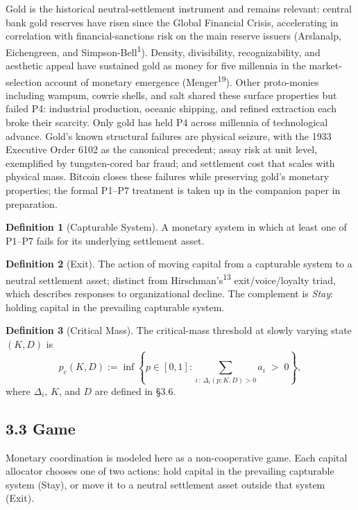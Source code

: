 \documentclass[12pt]{article}
\theoremstyle{definition}
\newtheorem{definition}{Definition}
\theoremstyle{remark}
\begin{document}
Gold is the historical neutral-settlement instrument and remains relevant: central bank gold reserves have risen since the Global Financial Crisis, accelerating in correlation with financial-sanctions risk on the main reserve issuers (Arslanalp, Eichengreen, and Simpson-Bell\textsuperscript{1}). Density, divisibility, recognizability, and aesthetic appeal have sustained gold as money for five millennia in the market-selection account of monetary emergence (Menger\textsuperscript{19}). Other proto-monies including wampum, cowrie shells, and salt shared these surface properties but failed P4: industrial production, oceanic shipping, and refined extraction each broke their scarcity. Only gold has held P4 across millennia of technological advance. Gold's known structural failures are physical seizure, with the 1933 Executive Order 6102 as the canonical precedent; assay risk at unit level, exemplified by tungsten-cored bar fraud; and settlement cost that scales with physical mass. Bitcoin closes these failures while preserving gold's monetary properties; the formal P1--P7 treatment is taken up in the companion paper in preparation.


\begin{definition}[Capturable System]
A monetary system in which at least one of P1--P7 fails for its
underlying settlement asset.
\end{definition}

\begin{definition}[Exit]
The action of moving capital from a capturable system to a neutral
settlement asset; distinct from Hirschman's\textsuperscript{13}
exit/voice/loyalty triad, which describes responses to
organizational decline. The complement is \emph{Stay}: holding
capital in the prevailing capturable system.
\end{definition}

\begin{definition}[Critical Mass]
The critical-mass threshold at slowly varying state $(K, D)$ is
\[
p_c(K, D) := \inf\left\{ p \in [0, 1] : \sum_{i\,:\,\Delta_i(p; K, D) > 0} a_i \;>\; 0 \right\},
\]
where $\Delta_i$, $K$, and $D$ are defined in \S3.6.
\end{definition}


\subsection{3.3 Game}

Monetary coordination is modeled here as a non-cooperative game. Each capital allocator chooses one of two
actions: hold capital in the prevailing capturable system (Stay),
or move it to a neutral settlement asset outside that system
(Exit).
\end{document}

